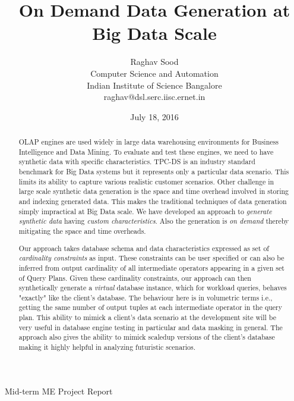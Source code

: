 \documentclass[]{article}
\title{\large \bf On Demand Data Generation at Big Data Scale}
\author{Raghav Sood \\ Computer Science and Automation \\ Indian Institute of Science Bangalore \\ raghav@dsl.serc.iisc.ernet.in}
\date{July 18, 2016}
\begin{document}
    \maketitle
    \begin{center}
        Mid-term ME Project Report
    \end{center}
        \vskip 12pt
	\thispagestyle{empty}
	
	\begin{abstract}
		OLAP engines are used widely in large data warehousing environments for Business Intelligence and Data Mining. 
		To evaluate and test these engines, we need to have synthetic data with specific characteristics. 
		TPC-DS \cite{tpcds} is an industry standard benchmark for Big Data systems but it represents only a particular data scenario. This limits its ability to capture various realistic customer scenarios. 
		Other challenge in large scale synthetic data generation is the space and time overhead involved in storing and indexing generated data. This makes the traditional techniques of data generation simply impractical at Big Data scale. 
		We have developed an approach to \textit{generate synthetic data} having \textit{custom characteristics}. Also the generation is \textit{on demand} thereby mitigating the space and time overheads. 

		Our approach takes database schema and data characteristics expressed as set of \textit{cardinality constraints} \cite{arasu} as input. 
		These constraints can be user specified or can also be inferred from output cardinality of all intermediate operators appearing in a given set of Query Plans. 
		Given these cardinality constraints, our approach can then synthetically generate a \textit{virtual} database instance, which for workload queries, behaves "exactly" like the client's database. The behaviour here is in volumetric terms i.e., getting the same number of output tuples at each intermediate operator in the query plan. 
		This ability to mimick a client's data scenario at the development site will be very useful in database engine testing in particular and data masking in general.
		The approach also gives the ability to mimick scaledup versions of the client's database making it highly helpful in analyzing futuristic scenarios. 
		 
	\end{abstract}	
	
	\hfill \\
	
\end{document}

